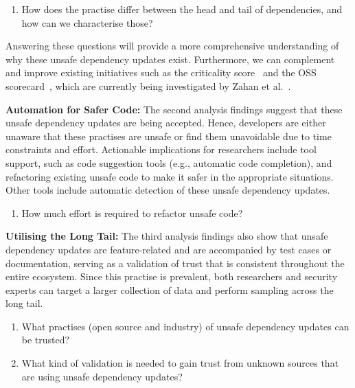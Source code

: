 \documentclass[sigconf,screen]{acmart}
\begin{document}
\begin{sloppy}
\begin{enumerate}[resume]

    \item How does the practise differ between the head and tail of dependencies, and how can we characterise those? 
\end{enumerate}

Answering these questions will provide a more comprehensive understanding of why these unsafe dependency updates exist.
Furthermore, we can complement and improve existing initiatives such as the criticality score~\citep{GitHubos50:online} and the OSS scorecard~\citep{GitHubos53:online}, which are currently being investigated by Zahan et al.~\citep{zahan:icse2023}.


\textbf{Automation for Safer Code:} The second analysis findings suggest that these unsafe dependency updates are being accepted.
Hence, developers are either unaware that these practises are unsafe or find them unavoidable due to time constraints and effort.
Actionable implications for researchers include tool support, such as code suggestion tools (e.g., automatic code completion), and refactoring existing unsafe code to make it safer in the appropriate situations.
Other tools include automatic detection of these unsafe dependency updates.
\begin{enumerate}[resume]
   
    \item How much effort is required to refactor unsafe code?

\end{enumerate}
\textbf{Utilising the Long Tail:}
The third analysis findings also show that unsafe dependency updates are feature-related and are accompanied by test cases or documentation, serving as a validation of trust that is consistent throughout the entire ecosystem.
Since this practise is prevalent, both researchers and security experts can target a larger collection of data and perform sampling across the long tail.

\begin{enumerate}[resume]
   
    \item What practises (open source and industry) of unsafe dependency updates can be trusted?
    \item What kind of validation is needed to gain trust from unknown sources that are using unsafe dependency updates?
 
\end{enumerate}


\end{sloppy}
\end{document}
